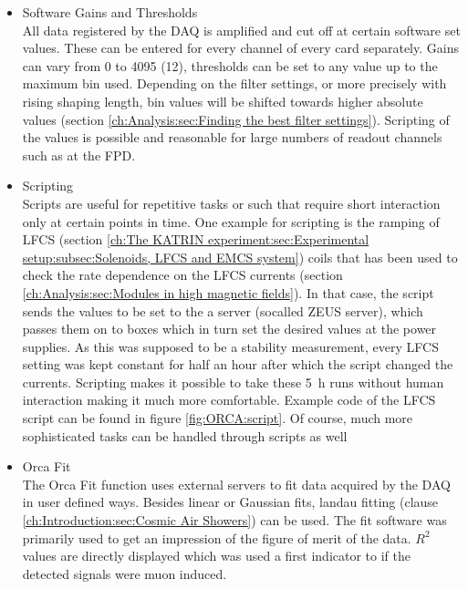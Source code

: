 \begin{itemize}
    \item Software Gains and Thresholds\\
    All data registered by the DAQ is amplified and cut off at certain software set values. These can be entered for every channel of every card separately. Gains can vary from \SI{0}{} to \SI{4095}{} (\SI{12}{\bit}), thresholds can be set to any value up to the maximum bin used. Depending on the filter settings, or more precisely with rising shaping length, bin values will be shifted towards higher absolute values (section \ref{ch:Analysis:sec:Finding the best filter settings}).
    Scripting of the values is possible and reasonable for large numbers of readout channels such as at the FPD.
    \item Scripting\\
    Scripts are useful for repetitive tasks or such that require short interaction only at certain points in time. One example for scripting is the ramping of LFCS (section \ref{ch:The KATRIN experiment:sec:Experimental setup:subsec:Solenoids, LFCS and EMCS system}) coils that has been used to check the rate dependence on the LFCS currents (section \ref{ch:Analysis:sec:Modules in high magnetic fields}). In that case, the script sends the values to be set to the a server (socalled ZEUS server), which passes them on to  boxes which in turn set the desired values at the power supplies. As this was supposed to be a stability measurement, every LFCS setting was kept constant for half an hour after which the script changed the currents. Scripting makes it possible to take these \SI{5}{\hour} runs without human interaction making it much more comfortable. Example code of the LFCS script can be found in figure \ref{fig:ORCA:script}. Of course, much more sophisticated tasks can be handled through scripts as well
    \item Orca Fit\\
    The Orca Fit function uses external servers to fit data acquired by the DAQ in user defined ways. Besides linear or Gaussian fits, landau fitting (clause \ref{ch:Introduction:sec:Cosmic Air Showers}) can be used. The fit software was primarily used to get an impression of the figure of merit of the data. $R^2$ values are directly displayed which was used a first indicator to if the detected signals were muon induced.
  \end{itemize}
  

